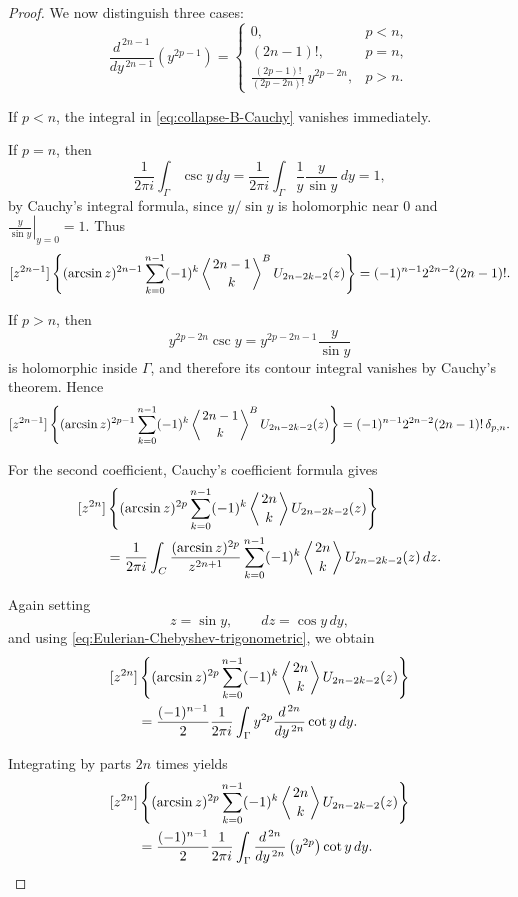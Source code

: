 \documentclass[11pt,twoside]{article}
\numberwithin{equation}{section}
\begin{document}
\begin{proof}
We now distinguish three cases:
\[
\frac{d^{\,2n-1}}{dy^{\,2n-1}}
\left(y^{2p-1}\right)
=
\begin{cases}
0,
& p<n,
\\[1ex]
(2n-1)!,
& p=n,
\\[1ex]
\displaystyle
\frac{(2p-1)!}{(2p-2n)!}\,
y^{2p-2n},
& p>n.
\end{cases}
\]

If $p<n$, the integral in
\cref{eq:collapse-B-Cauchy} vanishes immediately.

If $p=n$, then
\[
\frac{1}{2\pi i}
\int_{\Gamma}\csc y\,dy
=
\frac{1}{2\pi i}
\int_{\Gamma}
\frac{1}{y}\frac{y}{\sin y}\,dy
=1,
\]
by Cauchy's integral formula, since $y/\sin y$ is holomorphic
near $0$ and \(\displaystyle\left.\frac{y}{\sin y}\right|_{y=0}=1.\)
Thus
\[
[z^{2n-1}]\left\{
(\arcsin z)^{2n-1}
\sum_{k=0}^{n-1}
(-1)^k
\left\langle {2n-1\atop k}\right\rangle^{B}
U_{2n-2k-2}(z)\right\}
=
(-1)^{n-1}2^{2n-2}(2n-1)!.
\]

If $p>n$, then
\[
y^{2p-2n}\csc y
=
y^{2p-2n-1}\frac{y}{\sin y}
\]
is holomorphic inside $\Gamma$, and therefore its contour integral
vanishes by Cauchy's theorem. Hence
\[
[z^{2n-1}]\left\{
(\arcsin z)^{2p-1}
\sum_{k=0}^{n-1}
(-1)^k
\left\langle {2n-1\atop k}\right\rangle^{B}
U_{2n-2k-2}(z)\right\}
=
(-1)^{n-1}2^{2n-2}(2n-1)!\,\delta_{p,n}.
\]

For the second coefficient, Cauchy's coefficient formula gives
\begin{align*}
&[z^{2n}]\left\{
(\arcsin z)^{2p}
\sum_{k=0}^{n-1}
(-1)^k
\left\langle {2n\atop k}\right\rangle
U_{2n-2k-2}(z)\right\}
\\
&\qquad=
\frac{1}{2\pi i}
\int_C
\frac{(\arcsin z)^{2p}}{z^{2n+1}}
\sum_{k=0}^{n-1}
(-1)^k
\left\langle {2n\atop k}\right\rangle
U_{2n-2k-2}(z)\,dz.
\end{align*}

Again setting
\[
z=\sin y,
\qquad
dz=\cos y\,dy,
\]
and using
\cref{eq:Eulerian-Chebyshev-trigonometric}, we obtain
\begin{align*}
&[z^{2n}]\left\{
(\arcsin z)^{2p}
\sum_{k=0}^{n-1}
(-1)^k
\left\langle {2n\atop k}\right\rangle
U_{2n-2k-2}(z)\right\}
\\
&\qquad=
\frac{(-1)^{n-1}}{2}
\frac{1}{2\pi i}
\int_{\Gamma}
y^{2p}
\frac{d^{\,2n}}{dy^{\,2n}}\cot y\,dy.
\end{align*}

Integrating by parts $2n$ times yields
\begin{align}
&[z^{2n}]\left\{
(\arcsin z)^{2p}
\sum_{k=0}^{n-1}
(-1)^k
\left\langle {2n\atop k}\right\rangle
U_{2n-2k-2}(z)\right\}
\nonumber\\
&\qquad=
\frac{(-1)^{n-1}}{2}
\frac{1}{2\pi i}
\int_{\Gamma}
\frac{d^{\,2n}}{dy^{\,2n}}
\left(y^{2p}\right)
\cot y\,dy.
\label{eq:collapse-A-Cauchy}
\end{align}


\end{proof}
\end{document}

